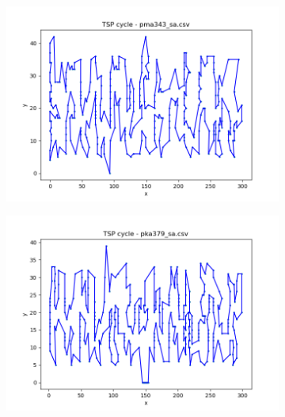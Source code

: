 \documentclass[12pt]{article}
\begin{document}
        \begin{figure}[htpb]
        \centering
            \begin{subfigure}[b]{0.475\textwidth}
                \includegraphics[width=\linewidth]{img/pma343_sa.png}
            \end{subfigure}
            \hfill
            \begin{subfigure}[b]{0.475\textwidth}
                \includegraphics[width=\linewidth]{img/pka379_sa.png}
            \end{subfigure}
            \begin{subfigure}[b]{0.475\textwidth}

\end{subfigure}
\end{figure}
\end{document}
